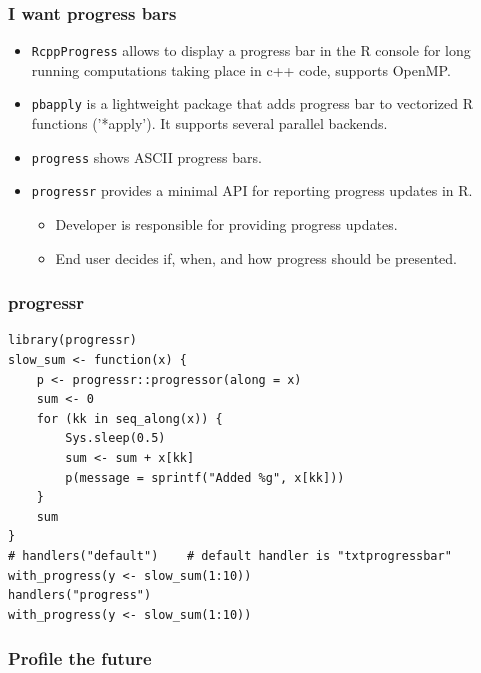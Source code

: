 \documentclass[aspectratio=169,xcolor={dvipsnames,table}]{beamer}
\begin{document}
\begin{frame}
  \frametitle{I want progress bars}
  \begin{itemize}
  \item \texttt{RcppProgress} allows to display a progress bar in the R console for long running computations taking place in c++ code, supports OpenMP.
  \item \texttt{pbapply} is a lightweight package that adds progress bar to vectorized R functions ('*apply'). It supports several parallel backends.
  \item \texttt{progress} shows ASCII progress bars. 
  \item \texttt{progressr} provides a minimal API for reporting progress updates in R.
    \begin{itemize}
    \item Developer is responsible for providing progress updates.
    \item End user decides if, when, and how progress should be presented. 
    \end{itemize}
  \end{itemize}
\end{frame}

\begin{frame}[fragile]
  \frametitle{progressr}
\begin{verbatim}
library(progressr)
slow_sum <- function(x) {
    p <- progressr::progressor(along = x)
    sum <- 0
    for (kk in seq_along(x)) {
        Sys.sleep(0.5)
        sum <- sum + x[kk]
        p(message = sprintf("Added %g", x[kk]))
    }
    sum
}
# handlers("default")    # default handler is "txtprogressbar"
with_progress(y <- slow_sum(1:10))
handlers("progress")
with_progress(y <- slow_sum(1:10))
\end{verbatim}
\end{frame}

\begin{frame}[fragile]
  \frametitle{Profile the future}
\end{frame}




\end{document}

